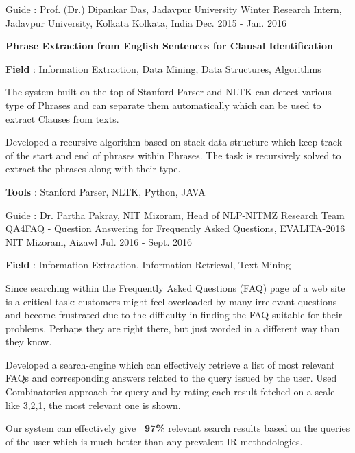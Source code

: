 \begin{cventries}
  \cventry
    {Guide : Prof. (Dr.) Dipankar Das, Jadavpur University}
    {Winter Research Intern, Jadavpur University, Kolkata}
    {Kolkata, India}
    {Dec. 2015 - Jan. 2016}
    {
      \begin{cvitems}
        \item\textbf {Phrase Extraction from English Sentences for Clausal Identification} 
        \item{\textbf{Field} : Information Extraction, Data Mining, Data Structures, Algorithms}
        \item{The system built on the top of Stanford Parser and NLTK can detect various type of Phrases and
 can separate them automatically which can be used to extract Clauses from texts.}
        \item{Developed a recursive algorithm
 based on stack data structure which keep track of the start and end of phrases within Phrases. The task
 is recursively solved to extract the phrases along with their type.}
        \item {\textbf{Tools} : Stanford Parser, NLTK, Python, JAVA}
      \end{cvitems}
    }
          \cventry
    {Guide : Dr. Partha Pakray, NIT Mizoram, Head of NLP-NITMZ Research Team}
    {QA4FAQ - Question Answering for Frequently Asked Questions, EVALITA-2016}
    {NIT Mizoram, Aizawl}
    {Jul. 2016 - Sept. 2016}
    {
      \begin{cvitems}
        \item{\textbf{Field} : Information Extraction, Information Retrieval, Text Mining}
        \item{Since searching within the Frequently Asked Questions (FAQ) page of a web site is a critical task: customers might feel overloaded by many irrelevant questions and become frustrated due to the difficulty in finding the FAQ suitable for their problems. Perhaps they are right there, but just worded in a different way than they know.}
        \item{Developed a search-engine which can effectively retrieve a list of most relevant FAQs and corresponding answers related to the query issued by the user. Used Combinatorics approach for query and by rating each result fetched on a scale like 3,2,1, the most relevant one is shown.}
        \item{Our system can effectively give \textbf{~97\%} relevant search results based on the queries of the user which is much better than any prevalent IR methodologies.}

\end{cvitems}}
\end{cventries}
